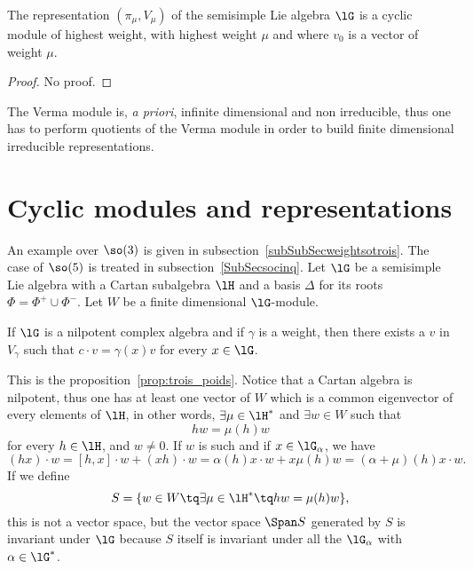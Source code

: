 \begin{theorem}
The representation $(\pi_{\mu},V_{\mu})$ of the semisimple Lie algebra $\lG$ is a cyclic module of highest weight, with highest weight $\mu$ and where $v_0$ is a vector of weight $\mu$.
\end{theorem}
\begin{proof}
    No proof.
\end{proof}
The Verma module is, \emph{a priori}, infinite dimensional and non irreducible, thus one has to perform quotients of the Verma module in order to build finite dimensional irreducible representations.


                    \section{Cyclic modules and representations}

An example over $\so(3)$ is given in subsection~\ref{subSubSecweightsotrois}. The case of $\so(5)$ is treated in subsection~\ref{SubSecsocinq}. Let $\lG$ be a semisimple Lie algebra with a Cartan subalgebra $\lH$ and a basis $\Delta$ for its roots $\Phi=\Phi^+\cup\Phi^-$. Let $W$ be a finite dimensional $\lG$-module.

\begin{lemma}
If $\lG$ is a nilpotent complex algebra and if $\gamma$ is a weight, then there exists a $v$ in $V_{\gamma}$ such that $c\cdot v=\gamma(x)v$ for every $x\in\lG$.
\end{lemma}
This is the proposition~\ref{prop:trois_poids}. Notice that a Cartan algebra is nilpotent, thus one has at least one vector of $W$ which is a common eigenvector of every elements of $\lH$, in other words, $\exists\mu\in\lH^*$ and $\exists w\in W$ such that
\begin{equation}
    hw=\mu(h)w
\end{equation}
for every $h\in\lH$, and $w\neq 0$. If $w$ is such and if $x\in\lG_{\alpha}$, we have
\begin{equation}
    (hx)\cdot w=[h,x]\cdot w+(xh)\cdot w=\alpha(h)x\cdot w+x\mu(h)w=(\alpha+\mu)(h)x\cdot w.
\end{equation}
If we define
\begin{equation}
    S=\{ w\in W\tq\exists\mu\in\lH^*\tq hw=\mu(h)w \},
\end{equation}
this is not a vector space, but the vector space $\Span S$ generated by $S$ is invariant under $\lG$ because $S$ itself is invariant under all the $\lG_{\alpha}$ with $\alpha\in\lG^*$.

